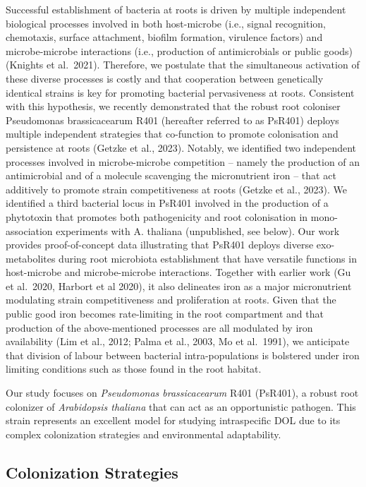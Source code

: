 \documentclass[
  11pt,
  a4paper,
]{report}
\begin{document}
Successful establishment of bacteria at roots is driven by multiple
independent biological processes involved in both host-microbe (i.e.,
signal recognition, chemotaxis, surface attachment, biofilm formation,
virulence factors) and microbe-microbe interactions (i.e., production of
antimicrobials or public goods) (Knights et al.~2021). Therefore, we
postulate that the simultaneous activation of these diverse processes is
costly and that cooperation between genetically identical strains is key
for promoting bacterial pervasiveness at roots. Consistent with this
hypothesis, we recently demonstrated that the robust root coloniser
Pseudomonas brassicacearum R401 (hereafter referred to as PsR401)
deploys multiple independent strategies that co-function to promote
colonisation and persistence at roots (Getzke et al., 2023). Notably, we
identified two independent processes involved in microbe-microbe
competition -- namely the production of an antimicrobial and of a
molecule scavenging the micronutrient iron -- that act additively to
promote strain competitiveness at roots (Getzke et al., 2023). We
identified a third bacterial locus in PsR401 involved in the production
of a phytotoxin that promotes both pathogenicity and root colonisation
in mono-association experiments with A. thaliana (unpublished, see
below). Our work provides proof-of-concept data illustrating that PsR401
deploys diverse exo-metabolites during root microbiota establishment
that have versatile functions in host-microbe and microbe-microbe
interactions. Together with earlier work (Gu et al.~2020, Harbort et al
2020), it also delineates iron as a major micronutrient modulating
strain competitiveness and proliferation at roots. Given that the public
good iron becomes rate-limiting in the root compartment and that
production of the above-mentioned processes are all modulated by iron
availability (Lim et al., 2012; Palma et al., 2003, Mo et al.~1991), we
anticipate that division of labour between bacterial intra-populations
is bolstered under iron limiting conditions such as those found in the
root habitat.

Our study focuses on \emph{Pseudomonas brassicacearum} R401 (PsR401), a
robust root colonizer of \emph{Arabidopsis thaliana} that can act as an
opportunistic pathogen. This strain represents an excellent model for
studying intraspecific DOL due to its complex colonization strategies
and environmental adaptability.

\subsection{Colonization Strategies}\label{colonization-strategies}
\end{document}
